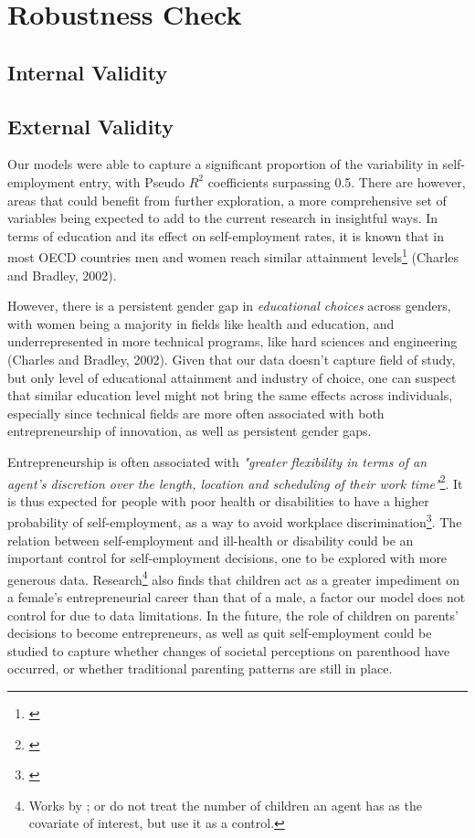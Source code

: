 \section{Robustness Check}

\subsection{Internal Validity}

\subsection{External Validity}

Our models were able to capture a significant proportion of the variability in self-employment entry, with Pseudo $R^2$ coefficients surpassing 0.5. There are however, areas that could benefit from further exploration, a more comprehensive set of variables being expected to add to the current research in insightful ways. In terms of education and its effect on self-employment rates, it is known that in most OECD countries men and women reach similar attainment levels\footnote{\cite{}} (Charles and Bradley, 2002). 

However, there is a persistent gender gap in \textit{educational choices} across genders, with women being a majority in fields like health and education, and underrepresented in more technical programs, like hard sciences and engineering (Charles and Bradley, 2002). Given that our data doesn't capture field of study, but only level of educational attainment and industry of choice, one can suspect that similar education level might not bring the same effects across individuals, especially since technical fields are more often associated with both entrepreneurship of innovation, as well as persistent gender gaps. 

Entrepreneurship is often associated with \textit{"greater flexibility in terms of an agent's discretion over the length, location and scheduling of their work time"}\footnote{\cite{Quinn1980}}. It is thus expected for people with poor health or disabilities to have a higher probability of self-employment, as a way to avoid workplace discrimination\footnote{\cite{Quinn1980}}. The relation between self-employment and ill-health or disability could be an important control for self-employment decisions, one to be explored with more generous data. Research\footnote{ Works by \cite{BurkeFitzroyNolan2002}; \cite{GeorgellisWall2005} or \cite{CowlingTaylor2001} do not treat the number of children an agent has as the covariate of interest, but use it as a control.} also finds that children act as a greater impediment on a female's entrepreneurial career than that of a male, a factor our model does not control for due to data limitations. In the future, the role of children on parents' decisions to become entrepreneurs, as well as quit self-employment could be studied to capture whether changes of societal perceptions on parenthood have occurred, or whether traditional parenting patterns are still in place.  

